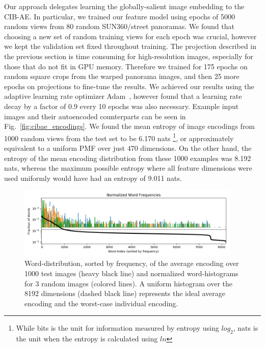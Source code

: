 Our approach delegates learning the globally-salient image embedding to the CIB-AE. In particular, we trained our feature model using epochs of 5000 random views from 80 random SUN360/street panoramas. We found that choosing a new set of random training views for each epoch was crucial, however we kept the validation set fixed throughout training. The projection described in the previous section is time consuming for high-resolution images, especially for those that do not fit in GPU memory. Therefore we trained for 175 epochs on random square crops from the warped panorama images, and then 25 more epochs on projections to fine-tune the results. We achieved our results using the adaptive learning rate optimizer Adam~\citep{KingmaAdam}, however found that a learning rate decay by a factor of 0.9 every 10 epochs was also necessary. Example input images and their autoencoded counterparts can be seen in Fig.~\ref{fig:cibae_encodings}. We found the mean entropy of image encodings from 1000 random views from the test set to be 6.170 nats \footnote{While bits is the unit for information measured by entropy using $log_2$, nats is the unit when the entropy is calculated using $ln$}, or approximately equivalent to a uniform PMF over just 470 dimensions. On the other hand, the entropy of the mean encoding distribution from these 1000 examples was 8.192 nats, whereas the maximum possible entropy where all feature dimensions were used uniformly would have had an entropy of 9.011 nats.

\begin{figure}
    \centering
    \includegraphics[width=0.95\textwidth]{figures/ptz/word_frequency}
    \caption{Word-distribution, sorted by frequency, of the average encoding over 1000 test images (heavy black line) and normalized
             word-histograms for 3 random images (colored lines). A uniform histogram over the 8192 dimensions (dashed black line) represents the ideal average encoding and the worst-case individual encoding.}
    \label{fig:cibae-words-distribution}
\end{figure}

